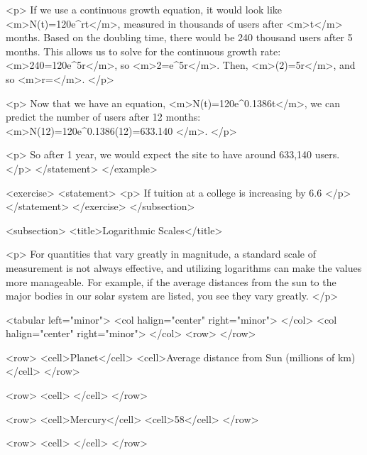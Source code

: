                 <p>
                    If we use a continuous growth equation, it would look like <m>N(t)=120e^{r}t</m>, measured in thousands of users after <m>t</m> months.
                    Based on the doubling time, there would be 240 thousand users after 5 months.
                    This allows us to solve for the continuous growth rate: <m>240=120e^{5r}</m>, so <m>2=e^{5r}</m>.
                    Then, <m>\ln(2)=5r</m>, and so <m>r=</m>.
                </p>

                <p>
                    Now that we have an equation, <m>N(t)=120e^{0.1386t}</m>, we can predict the number of users after 12 months: <m>N(12)=120e^{0.1386(12)}=633.140 </m>.
                </p>

                <p>
                    So after 1 year, we would expect the site to have around 633,140 users.
                </p>
            </statement>
        </example>

        <exercise>
            <statement>
                <p>
                    If tuition at a college is increasing by 6.6%
                </p>
            </statement>
        </exercise>
    </subsection>


    <subsection>
        <title>Logarithmic Scales</title>

        <p>
            For quantities that vary greatly in magnitude, a standard scale of measurement is not always effective, and utilizing logarithms can make the values more manageable.
            For example, if the average distances from the sun to the major bodies in our solar system are listed, you see they vary greatly.
        </p>

        <tabular left="minor">
            <col halign="center" right="minor"> </col> <col halign="center" right="minor"> </col>
            <row>
            </row>

            <row>
                <cell>Planet</cell>
                <cell>Average distance from Sun (millions of km)</cell>
            </row>

            <row>
                <cell> </cell>
            </row>

            <row>
                <cell>Mercury</cell>
                <cell>58</cell>
            </row>

            <row>
                <cell> </cell>
            </row>

